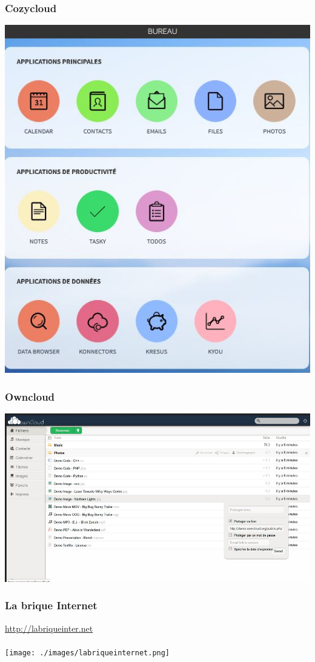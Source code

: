 \documentclass{beamer}
\begin{document}
\begin{frame}
\begin{center}
\frametitle{Cozycloud}
\includegraphics[scale=0.6] {./images/Cozycloud.jpg}
\end{center}
\end{frame}

\begin{frame}
\begin{center}
\frametitle{Owncloud}
\includegraphics[scale=0.6] {./images/owncloud.jpg}
\end{center}
\end{frame}
\begin{frame}
\begin{center}
\frametitle{La brique Internet}
\url{http://labriqueinter.net}
\\~\\
\texttt{[image: ./images/labriqueinternet.png]}
\end{center}
\end{frame}
\end{document}
